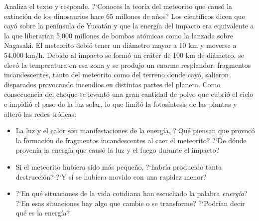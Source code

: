\documentclass[11pt]{book}
\begin{document}
Analiza el texto y responde.
?`Conoces la teor\'ia del meteorito que caus\'o la extinci\'on de los dinosaurios
hace 65 millones de años? Los cient\'ificos dicen que cay\'o sobre la pen\'insula
de Yucat\'an y que la energ\'ia del impacto era equivalente a la que liberar\'ian
5,000 millones de bombas at\'omicas como la lanzada sobre Nagasaki. El
meteorito debi\'o tener un di\'ametro mayor a 10 km y moverse a 54,000 km/h.
Debido al impacto se form\'o un cr\'ater de 100 km de di\'ametro, se elev\'o
la temperatura en esa zona y se produjo un enorme resplandor: fragmentos
incandescentes, tanto del meteorito como del terreno donde cay\'o, salieron
disparados provocando incendios en distintas partes del planeta.
Como consecuencia del choque se levant\'o una gran cantidad de polvo
que cubri\'o el cielo e impidi\'o el paso de la luz solar, lo que limit\'o la
fotos\'intesis de las plantas y alter\'o las redes tr\'oficas.
\begin{itemize}
  \item La luz y el calor son manifestaciones de la energ\'ia. ?`Qu\'e piensan que
        provoc\'o la formaci\'on de
        fragmentos incandescentes al caer el meteorito? ?`De
        d\'onde proven\'ia la energ\'ia que caus\'o la luz y el fuego durante el impacto?
  \item Si el meteorito hubiera sido m\'as pequeño, ?`habr\'ia producido tanta
        destrucci\'on? ?`Y si se
        hubiera movido con una rapidez menor?
  \item ?`En qu\'e situaciones de la vida cotidiana han escuchado la palabra
        \emph{energ\'ia}? ?`En esas
        situaciones hay algo que cambie o se transforme? ?`Podr\'ian decir qu\'e es la
        energ\'ia?
\end{itemize}

\end{document}
